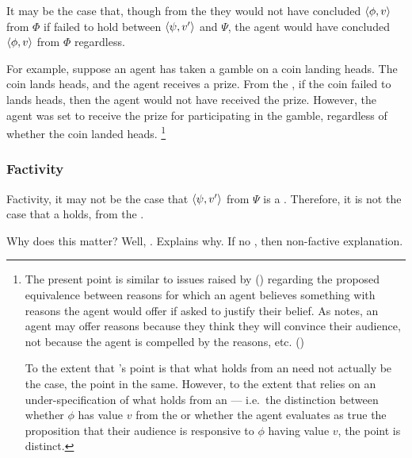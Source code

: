 \begin{note}
  It may be the case that, though from the \agpe{} they would not have concluded \(\langle \phi, v \rangle\) from \(\Phi\) if \ros{} failed to hold between \(\langle \psi, v' \rangle\) and \(\Psi\), the agent would have concluded \(\langle \phi, v \rangle\) from \(\Phi\) regardless.

  For example, suppose an agent has taken a gamble on a coin landing heads.
  The coin lands heads, and the agent receives a prize.
  From the \agpe{}, if the coin failed to lands heads, then the agent would not have received the prize.
  However, the agent was set to receive the prize for participating in the gamble, regardless of whether the coin landed heads.%
  \footnote{
    The present point is similar to issues raised by \citeauthor{Harman:1973ww} (\citeyear{Harman:1973ww}) regarding the proposed equivalence between reasons for which an agent believes something with reasons the agent would offer if asked to justify their belief.
  As \citeauthor{Harman:1973ww} notes, an agent may offer reasons because they think they will convince their audience, not because the agent is compelled by the reasons, etc.
  (\citeyear[Ch.2]{Harman:1973ww})

  To the extent that \citeauthor{Harman:1973ww}'s point is that what holds from an \agpe{} need not actually be the case, the point in the same.
  However, to the extent that \citeauthor{Harman:1973ww} relies on an under-specification of what holds from an \agpe{} --- i.e.\ the distinction between whether \(\phi\) has value \(v\) from the \agpe{} or whether the agent evaluates as true the proposition that their audience is responsive to \(\phi\) having value \(v\), the point is distinct.
  }
\end{note}

\subsubsection{Factivity}
\label{sec:factivity-1}

\begin{note}
  Factivity, it may not be the case that \(\langle \psi, v' \rangle\) from \(\Psi\) is a \fc{}.
  Therefore, it is not the case that a \ros{} holds, from the \agpe{}.
\end{note}

\begin{note}
  Why does this matter?
  Well, \qWhyV{}.
  Explains why.
  If no \ros{}, then non-factive explanation.
\end{note}

